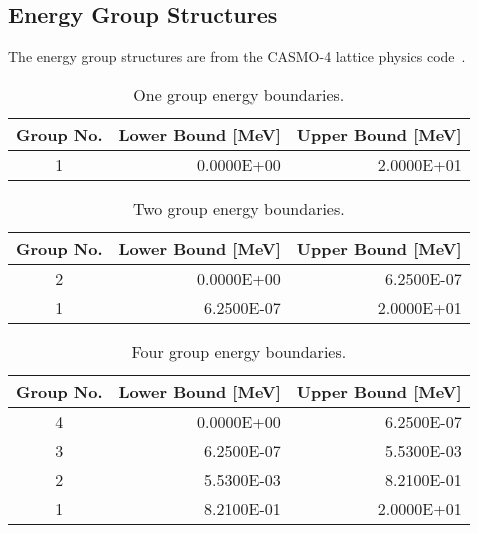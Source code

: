 \begin{appendices}

\chapter{Energy Group Structures}
\label{app:energy-groups}

The energy group structures are from the CASMO-4 lattice physics code~\cite{edenius1995casmo}.

\renewcommand{\arraystretch}{0.8}%

\begin{table}[h!]
  \centering
  \footnotesize
  \caption{One group energy boundaries.}
  \label{table:app-1-groups} 
  \vspace{14pt}
  \begin{tabular}{c r r}
    \toprule
    {\bf Group No.} &
    {\bf Lower Bound [MeV]} &
    {\bf Upper Bound [MeV]} \\
    \midrule
1 & 0.0000E+00 & 2.0000E+01 \\
    \bottomrule
   \end{tabular}
\end{table}

\begin{table}[h!]
  \centering
  \footnotesize
  \caption{Two group energy boundaries.}
  \label{table:app-2-groups} 
  \vspace{14pt}
  \begin{tabular}{c r r}
    \toprule
    {\bf Group No.} &
    {\bf Lower Bound [MeV]} &
    {\bf Upper Bound [MeV]} \\
    \midrule
2 & 0.0000E+00 & 6.2500E-07 \\
1 & 6.2500E-07 & 2.0000E+01 \\
  \bottomrule
 \end{tabular}
\end{table}

\begin{table}[h!]
  \centering
  \footnotesize
  \caption{Four group energy boundaries.}
  \label{table:app-4-groups} 
  \vspace{14pt}
  \begin{tabular}{c r r}
    \toprule
    {\bf Group No.} &
    {\bf Lower Bound [MeV]} &
    {\bf Upper Bound [MeV]} \\
    \midrule
4 & 0.0000E+00 & 6.2500E-07 \\
3 & 6.2500E-07 & 5.5300E-03 \\
2 & 5.5300E-03 & 8.2100E-01 \\
1 & 8.2100E-01 & 2.0000E+01 \\
  \bottomrule
 \end{tabular}
\end{table}


\end{appendices}
